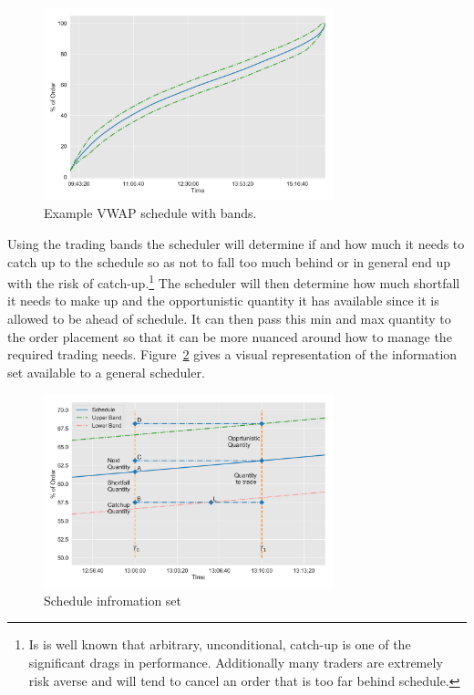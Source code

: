 	\begin{figure}[!ht]
	\centering
	\includegraphics[width=0.75\textwidth]{chapters/chapter_exec_models/figures/schedule.png} 
	\caption{Example VWAP schedule with bands.\label{fig:schedule}}
	\end{figure}


Using the trading bands the scheduler will determine if and how much it needs to catch up to the schedule so as not to fall too much behind or in general end up with the risk of catch-up.\footnote{Is is well known that arbitrary, unconditional, catch-up is one of the significant drags in performance. Additionally many traders are extremely risk averse and will tend to cancel an order that is too far behind schedule.} The scheduler will then determine how much shortfall it needs to make up and the opportunistic quantity it has available since it is allowed to be ahead of schedule. It can then pass this min and max quantity to the order placement so that it can be more nuanced around how to manage the required trading needs. Figure~\ref{fig:sch_details} gives a visual representation of the information set available to a general scheduler.


	\begin{figure}[!ht]
	\centering
	\includegraphics[width=0.75\textwidth]{chapters/chapter_exec_models/figures/schedule_details.png} 
	\caption{Schedule infromation set \label{fig:sch_details}}
	\end{figure}


